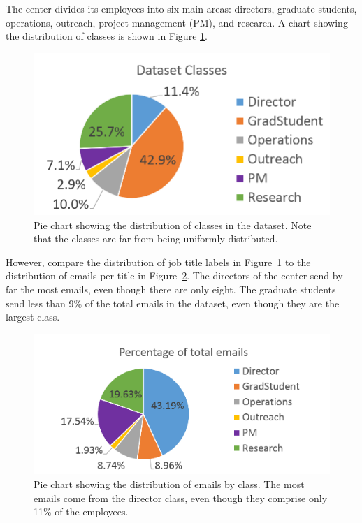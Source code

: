 \documentclass[12pt]{report}
\begin{document}
The center divides its employees into six main areas: directors, graduate students, operations, outreach, project management (PM), and research. 
A chart showing the distribution of classes is shown in Figure \ref{fig:class_breakdown}.
\begin{figure}[t]
    \centering
        \includegraphics[width=\columnwidth,trim={0mm 0mm 0mm 0mm},clip]{class_breakdown}
        \caption[Dataset class distribution pie chart]{Pie chart showing the distribution of classes in the dataset.  Note that the classes are far from being uniformly distributed.}
        \label{fig:class_breakdown}
\end{figure}

However, compare the distribution of job title labels in Figure~\ref{fig:class_breakdown} to the distribution of emails per title in Figure~\ref{fig:email_pie}.  The directors of the center send by far the most emails, even though there are only eight.  The graduate students send less than 9\% of the total emails in the dataset, even though they are the largest class.

\begin{figure}[t]
	\centering
	\includegraphics[width=\columnwidth,trim={0mm 0mm 0mm 0mm},clip]{Total_emails_by_class}
	\caption[Email distribution by job title]{Pie chart showing the distribution of emails by class.  The most emails come from the director class, even though they comprise only 11\% of the employees.}
	\label{fig:email_pie}
\end{figure}
\end{document}
